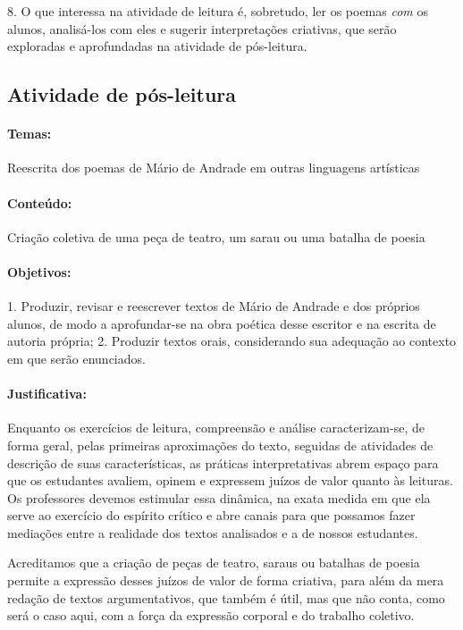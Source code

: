 \documentclass[11pt]{extarticle}
\begin{document}
8. O que interessa na atividade de leitura é, sobretudo, ler os poemas
\emph{com} os alunos, analisá-los com eles e sugerir interpretações
criativas, que serão exploradas e aprofundadas na atividade de
pós-leitura.

\subsection{Atividade de pós-leitura}



\paragraph{Temas:} Reescrita dos poemas de Mário de Andrade em outras
linguagens artísticas

\paragraph{Conteúdo:} Criação coletiva de uma peça de teatro, um sarau ou
uma batalha de poesia

\paragraph{Objetivos:} 1. Produzir, revisar e reescrever textos de Mário de
Andrade e dos próprios alunos, de modo a aprofundar-se na obra poética
desse escritor e na escrita de autoria própria; 2. Produzir textos
orais, considerando sua adequação ao contexto em que serão enunciados.

\paragraph{Justificativa:} Enquanto os exercícios de leitura, compreensão e
análise caracterizam-se, de forma geral, pelas primeiras aproximações do
texto, seguidas de atividades de descrição de suas características, as
práticas interpretativas abrem espaço para que os estudantes avaliem,
opinem e expressem juízos de valor quanto às leituras. Os professores
devemos estimular essa dinâmica, na exata medida em que ela serve ao
exercício do espírito crítico e abre canais para que possamos fazer
mediações entre a realidade dos textos analisados e a de nossos
estudantes.


Acreditamos que a criação de peças de teatro, saraus ou batalhas de
poesia permite a expressão desses juízos de valor de forma criativa,
para além da mera redação de textos argumentativos, que também é útil,
mas que não conta, como será o caso aqui, com a força da expressão
corporal e do trabalho coletivo.
\end{document}
